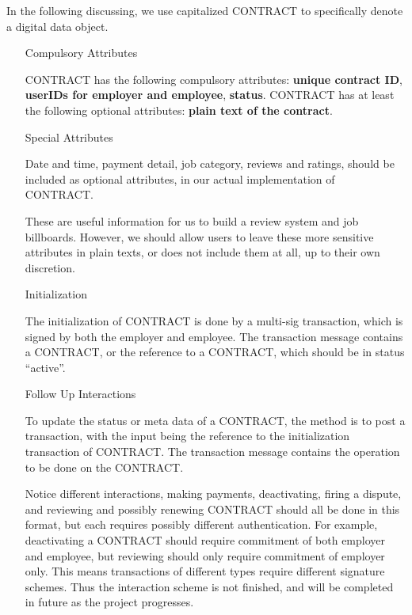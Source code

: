 \documentclass[]{scrartcl}
\begin{document}
In the following discussing, we use capitalized CONTRACT to specifically denote a digital data object.


\begin{enumerate}
	\item[Compulsory Attributes]

	 CONTRACT has the following compulsory attributes: \textbf{unique contract ID}, \textbf{userIDs for employer and employee}, \textbf{status}. CONTRACT has at least the following optional attributes: \textbf{plain text of the contract}.

	\item[Special Attributes] 

	Date and time, payment detail, job category, reviews and ratings, should be included as optional attributes, in our actual implementation of CONTRACT.
	
	These are useful information for us to build a review system and job billboards. 
	However, we should allow users to leave these more sensitive attributes in plain texts, or does not include them at all, up to their own discretion.


	\item[Initialization]

	The initialization of CONTRACT is done by a multi-sig transaction, which is signed by both the employer and employee. The transaction message contains a CONTRACT, or the reference to a CONTRACT, which should be in status “active”.	
	
	\item[Follow Up Interactions]

	To update the status or meta data of a CONTRACT, the method is to post a transaction, with the input being the reference to the initialization transaction of CONTRACT. The transaction message contains the operation to be done on the CONTRACT. 
	
	Notice different interactions, making payments, deactivating, firing a dispute, and reviewing and possibly renewing CONTRACT should all be done in this format, but each requires possibly different authentication. For example, deactivating a CONTRACT should require commitment of both employer and employee, but reviewing should only require commitment of employer only. This means transactions of different types require different signature schemes. Thus the interaction scheme is not finished, and will be completed in future as the project progresses.


\end{enumerate}
\end{document}
